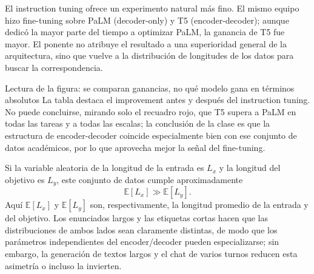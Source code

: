 El instruction tuning ofrece un experimento natural más fino. El mismo equipo hizo fine-tuning sobre PaLM (decoder-only) y T5 (encoder-decoder); aunque dedicó la mayor parte del tiempo a optimizar PaLM, la ganancia de T5 fue mayor. El ponente no atribuye el resultado a una superioridad general de la arquitectura, sino que vuelve a la distribución de longitudes de los datos para buscar la correspondencia.



\begin{knowledgebox}{Lectura de la figura: se comparan ganancias, no qué modelo gana en términos absolutos}
La tabla destaca el improvement antes y después del instruction tuning. No puede concluirse, mirando solo el recuadro rojo, que T5 supera a PaLM en todas las tareas y a todas las escalas; la conclusión de la clase es que la estructura de encoder-decoder coincide especialmente bien con ese conjunto de datos académicos, por lo que aprovecha mejor la señal del fine-tuning.
\end{knowledgebox}


Si la variable aleatoria de la longitud de la entrada es $L_x$ y la longitud del objetivo es $L_y$, este conjunto de datos cumple aproximadamente
\[
\mathbb{E}[L_x]\gg \mathbb{E}[L_y].
\]
Aquí $\mathbb{E}[L_x]$ y $\mathbb{E}[L_y]$ son, respectivamente, la longitud promedio de la entrada y del objetivo. Los enunciados largos y las etiquetas cortas hacen que las distribuciones de ambos lados sean claramente distintas, de modo que los parámetros independientes del encoder/decoder pueden especializarse; sin embargo, la generación de textos largos y el chat de varios turnos reducen esta asimetría o incluso la invierten.


